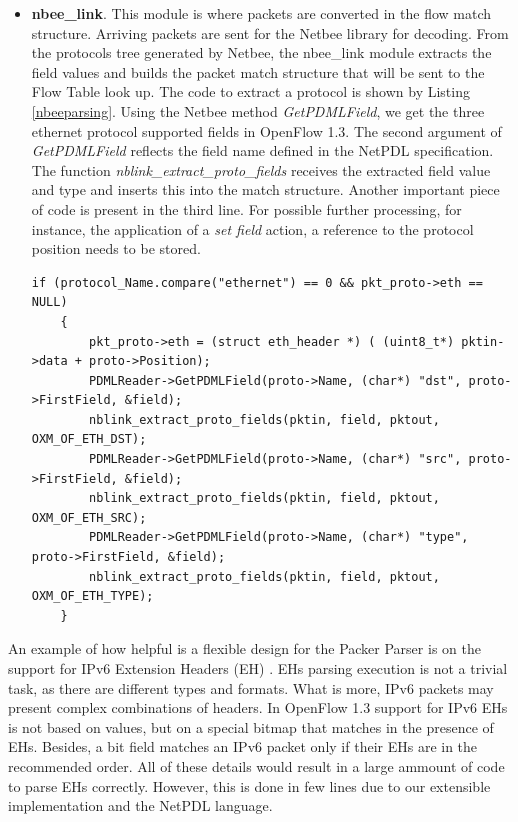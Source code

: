 \begin{itemize}
    \item \textbf{nbee_link}. This module is where packets are converted in the flow match structure. Arriving packets are sent for the Netbee library for decoding. From the protocols tree generated by Netbee, the nbee_link module   
extracts the field values and builds the packet match structure that will be sent to the Flow Table look up. The code to extract a protocol is shown by Listing \ref{nbeeparsing}. Using the Netbee method \textit{GetPDMLField}, we get the three ethernet protocol supported fields in OpenFlow 1.3. The second argument of \textit{GetPDMLField} reflects the field name defined in the NetPDL specification. The function \textit{nblink_extract_proto_fields} receives the extracted field value and type and inserts this into the match structure. Another important piece of code is present in the third line. For possible further processing, for instance, the application of a \textit{set field} action, a reference to the protocol position needs to be stored. 
    \pagebreak
    \begin{lstlisting}[caption={Ethernet parsing in the nbee_link module}, label=nbeeparsing,]
    if (protocol_Name.compare("ethernet") == 0 && pkt_proto->eth == NULL)
    {
        pkt_proto->eth = (struct eth_header *) ( (uint8_t*) pktin->data + proto->Position);
        PDMLReader->GetPDMLField(proto->Name, (char*) "dst", proto->FirstField, &field);
        nblink_extract_proto_fields(pktin, field, pktout, OXM_OF_ETH_DST);
        PDMLReader->GetPDMLField(proto->Name, (char*) "src", proto->FirstField, &field);
        nblink_extract_proto_fields(pktin, field, pktout, OXM_OF_ETH_SRC);
        PDMLReader->GetPDMLField(proto->Name, (char*) "type", proto->FirstField, &field);
        nblink_extract_proto_fields(pktin, field, pktout, OXM_OF_ETH_TYPE);
    }
    \end{lstlisting}      
    
    \end{itemize}
    
    An example of how helpful is a flexible design for the Packer Parser is on the support for IPv6 Extension Headers (EH) \cite{rfc2460}. EHs parsing execution is not a trivial task, as there are different types and formats. What is more, IPv6 packets may present complex combinations of headers. In OpenFlow 1.3 support for IPv6 EHs is not based on values, but on a special bitmap that matches in the presence of EHs. Besides, a bit field matches an IPv6 packet only if their EHs are in the recommended order. All of these details would result in a large ammount of code to parse EHs correctly. However, this is done in few lines due to our extensible implementation and the NetPDL language.    
